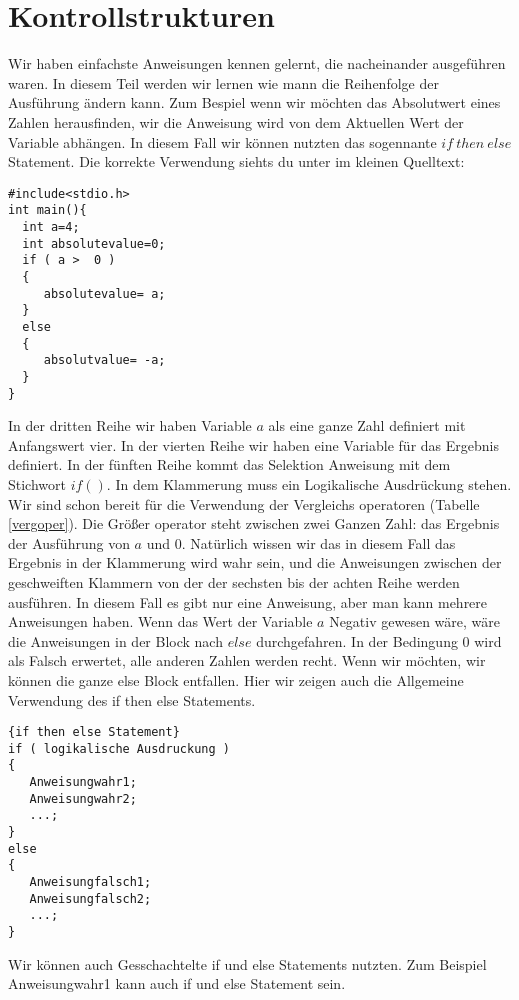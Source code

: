 \section{Kontrollstrukturen}

Wir haben einfachste Anweisungen kennen gelernt, die nacheinander ausgeführen waren. In diesem Teil werden wir lernen wie mann die Reihenfolge 
der Ausführung ändern kann. Zum Bespiel wenn wir möchten das Absolutwert  eines Zahlen herausfinden, wir die Anweisung wird von dem Aktuellen Wert
der Variable abhängen. In diesem Fall wir können nutzten das sogennante $if~then~else$ Statement. Die korrekte Verwendung siehts du unter im
kleinen Quelltext:
\begin{lstlisting}
#include<stdio.h>
int main(){
  int a=4;
  int absolutevalue=0;
  if ( a >  0 )
  {
     absolutevalue= a;
  }
  else
  {
     absolutvalue= -a;
  }
}
\end{lstlisting}
In der dritten  Reihe wir haben Variable $a$ als eine ganze Zahl definiert mit Anfangswert vier. In der vierten Reihe wir haben eine
Variable für das Ergebnis definiert. In der fünften Reihe kommt das Selektion Anweisung mit dem Stichwort $if ()$. In dem 
Klammerung muss ein Logikalische Ausdrückung stehen. Wir sind schon bereit für die Verwendung der Vergleichs operatoren (Tabelle \ref{vergoper}). 
Die Größer operator steht zwischen zwei Ganzen Zahl: das Ergebnis der Ausführung von $a$ und $0$. Natürlich wissen wir das in diesem Fall das
Ergebnis in der Klammerung wird wahr sein, und die  Anweisungen  zwischen  der geschweiften Klammern von der der sechsten bis der
achten Reihe werden ausführen. In diesem Fall es gibt nur eine Anweisung, aber man kann mehrere Anweisungen haben. Wenn das
Wert der Variable $a$ Negativ gewesen wäre, wäre die Anweisungen in der Block nach $else$ durchgefahren. In der Bedingung
0 wird als Falsch erwertet, alle anderen Zahlen werden recht. Wenn wir möchten, wir
können die ganze else Block entfallen. Hier wir zeigen auch die Allgemeine Verwendung des if then else Statements.

\begin{lstlisting}{if then else Statement}
if ( logikalische Ausdruckung )
{
   Anweisungwahr1;
   Anweisungwahr2;
   ...;
}
else
{
   Anweisungfalsch1;
   Anweisungfalsch2;
   ...;
}
\end{lstlisting}
Wir können auch Gesschachtelte if und else Statements nutzten. Zum Beispiel Anweisungwahr1 kann auch if und else Statement sein.

